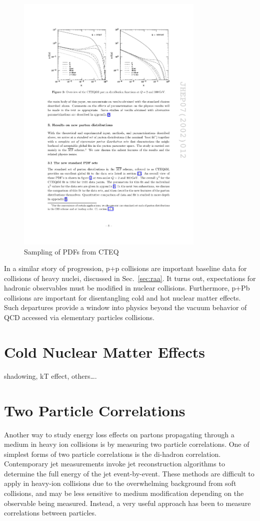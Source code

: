   \begin{figure}[htpb]
    \centering
    \includegraphics[width=0.8\textwidth]{Introduction/pdfs.pdf}
    \caption{Sampling of PDFs from CTEQ \cite{Pumplin2002}}
    \label{fig:dis_pdfs}
  \end{figure}

In a similar story of progression, p+p collisions are important baseline data for collisions of heavy nuclei, discussed in Sec.~\ref{sec:raa}. It turns out, expectations for hadronic observables must be modified in nuclear collisions. Furthermore, p+Pb collisions are important for disentangling cold and hot nuclear matter effects. Such departures provide a window into physics beyond the vacuum behavior of QCD accessed via elementary particles collisions. 


\section{Cold Nuclear Matter Effects}\label{sec:coldnm}
shadowing, kT effect, others\ldots.


\section{Two Particle Correlations}
Another way to study energy loss effects on partons propagating through a medium in heavy ion collisions is by measuring two particle correlations. One of simplest forms of two particle correlations is the di-hadron correlation. Contemporary jet measurements invoke jet reconstruction algorithms to determine the full energy of the jet event-by-event. These methods are difficult to apply in heavy-ion collisions due to the overwhelming background from soft collisions, and may be less sensitive to medium modification depending on the observable being measured. Instead, a very useful approach has been to measure correlations between particles.

